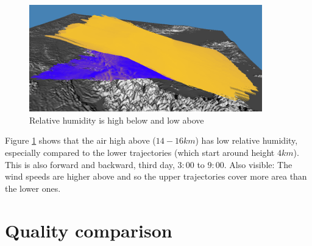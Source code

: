 \begin{figure}
\centering \includegraphics*[width=0.9\textwidth]{figures/0627_highanddry}
\caption{Relative humidity is high below and low above}
\label{fig:highanddry}
\end{figure}
Figure \ref{fig:highanddry} shows that the air high above ($14 - 16 km$) has low relative humidity, especially compared to the lower trajectories (which start around height $4 km$). This is also forward and backward, third day, $3:00$ to $9:00$. Also visible: The wind speeds are higher above and so the upper trajectories cover more area than the lower ones.







\section{Quality comparison}

